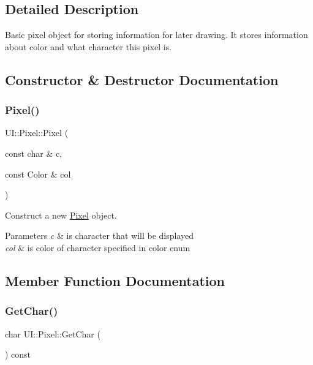 \subsection{Detailed Description}
Basic pixel object for storing information for later drawing. It stores information about color and what character this pixel is. 

\subsection{Constructor \& Destructor Documentation}
\mbox{\label{classUI_1_1Pixel_abf3c8bf5c8aa923e00fa636d2dbd3345}} 
\subsubsection{\texorpdfstring{Pixel()}{Pixel()}}
{\footnotesize\ttfamily U\+I\+::\+Pixel\+::\+Pixel (\begin{DoxyParamCaption}\item[{const char \&}]{c,  }\item[{const Color \&}]{col }\end{DoxyParamCaption})}



Construct a new \hyperlink{classUI_1_1Pixel}{Pixel} object. 


\begin{DoxyParams}{Parameters}
{\em c} & is character that will be displayed \\
\hline
{\em col} & is color of character specified in color enum \\
\hline
\end{DoxyParams}


\subsection{Member Function Documentation}
\mbox{\label{classUI_1_1Pixel_ab79e8a1113891a9260c3b77c3b17ac22}} 
\subsubsection{\texorpdfstring{Get\+Char()}{GetChar()}}
{\footnotesize\ttfamily char U\+I\+::\+Pixel\+::\+Get\+Char (\begin{DoxyParamCaption}{ }\end{DoxyParamCaption}) const}



